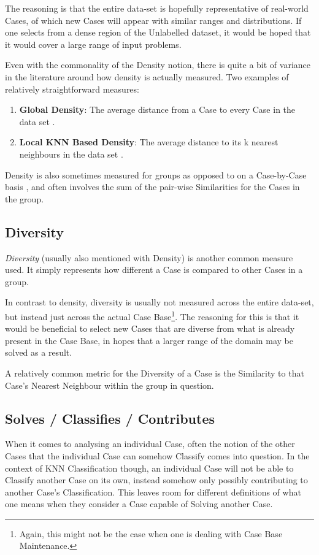 \documentclass[a4paper,11pt]{report}
\begin{document}
The reasoning is that the entire data-set is hopefully representative of real-world Cases, of which new Cases will appear with similar ranges and distributions. If one selects from a dense region of the Unlabelled dataset, it would be hoped that it would cover a large range of input problems.

\begin{samepage}
Even with the commonality of the Density notion, there is quite a bit of variance in the literature around how density is actually measured. Two examples of relatively straightforward measures:
\begin{enumerate}
	\item \textbf{Global Density}: The average distance from a Case to every Case in the data set \citep{Xu2007}.
	\item \textbf{Local KNN Based Density}: The average distance to its k nearest neighbours in the data set \citep{Zhu2008}.
\end{enumerate}
\end{samepage}

Density is also sometimes measured for groups as opposed to on a Case-by-Case basis \citep{Smyth1998}, and often involves the sum of the pair-wise Similarities for the Cases in the group.

\subsection{Diversity}

\emph{Diversity} (usually also mentioned with Density) is another common measure used. It simply represents how different a Case is compared to other Cases in a group.

In contrast to density, diversity is usually not measured across the entire data-set, but instead just across the actual Case Base\footnote{Again, this might not be the case when one is dealing with Case Base Maintenance.}. The reasoning for this is that it would be beneficial to select new Cases that are diverse from what is already present in the Case Base, in hopes that a larger range of the domain may be solved as a result. 

A relatively common metric for the Diversity of a Case is the Similarity to that Case's Nearest Neighbour within the group in question.

\subsection{Solves / Classifies / Contributes}
When it comes to analysing an individual Case, often the notion of the other Cases that the individual Case can somehow Classify comes into question. In the context of KNN Classification though, an individual Case will not be able to Classify another Case on its own, instead somehow only possibly contributing to another Case's Classification. This leaves room for different definitions of what one means when they consider a Case capable of Solving another Case. 
\end{document}
